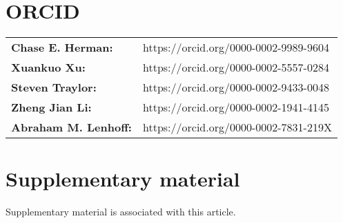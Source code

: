 \documentclass[preprint,review,12pt]{elsarticle}
\begin{document}


\section*{ORCID}
    \begin{tabular}{l l}
    \textbf{Chase E. Herman:} & https://orcid.org/0000-0002-9989-9604 \\
    \textbf{Xuankuo Xu:} & https://orcid.org/0000-0002-5557-0284 \\
    \textbf{Steven Traylor:} & https://orcid.org/0000-0002-9433-0048 \\
    \textbf{Zheng Jian Li:} & https://orcid.org/0000-0002-1941-4145 \\
    \textbf{Abraham M. Lenhoff:} & https://orcid.org/0000-0002-7831-219X \\
    \end{tabular}

\section*{Supplementary material}
    Supplementary material is associated with this article.



\end{document}
